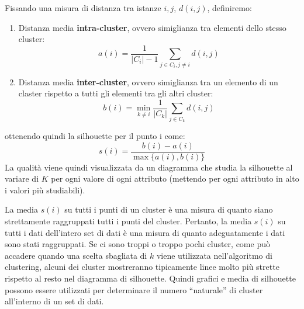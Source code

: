 Fissando una misura di distanza tra istanze $i,j$, $d(i, j)$, definiremo:
\begin{enumerate}
    \item Distanza media \textbf{intra-cluster}, ovvero simiglianza tra elementi
          dello stesso cluster:
          \begin{equation}
              a(i) = \frac{1}{|C_i| - 1} \sum_{j \in C_i, j \neq i} d(i, j)
          \end{equation}
    \item Distanza media \textbf{inter-cluster}, ovvero simiglianza tra un elemento
          di un claster rispetto a tutti gli elementi tra gli altri cluster:
          \begin{equation}
              b(i) = \min_{k \neq i} \frac{1}{|C_k|} \sum_{j \in C_k} d(i, j)
          \end{equation}
\end{enumerate}
ottenendo quindi la silhouette per il punto i come:
\begin{equation}
    s(i) = \frac{b(i) - a(i)}{\max\{a(i), b(i)\}}
\end{equation}
La qualità viene quindi visualizzata da un diagramma che studia la silhouette al
variare di $K$ per ogni valore di ogni attributo (mettendo per ogni attributo in
alto i valori più studiabili).

La media $s(i)$ su tutti i punti di un cluster è una misura di quanto siano
strettamente raggruppati tutti i punti del cluster. Pertanto, la media $s(i)$ su
tutti i dati dell'intero set di dati è una misura di quanto adeguatamente i dati
sono stati raggruppati. Se ci sono troppi o troppo pochi cluster, come può accadere
quando una scelta sbagliata di $k$ viene utilizzata nell'algoritmo di clustering,
alcuni dei cluster mostreranno tipicamente linee molto più strette rispetto al
resto nel diagramma di silhouette. Quindi grafici e media di silhouette possono
essere utilizzati per determinare il numero “naturale” di cluster all'interno di
un set di dati.